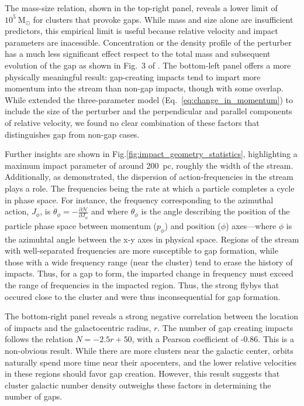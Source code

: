 \documentclass{aa}
\begin{document}
    The mass-size relation, shown in the top-right panel, reveals a lower limit of $10^5~\textrm{M}_{\odot}$ for clusters that provoke gaps. While mass and size alone are insufficient predictors, this empirical limit is useful because relative velocity and impact parameters are inacessible. Concentration or the density profile of the perturber has a much less significant effect respect to the total mass and subsequent evolution of the gap as shown in Fig.~3 of \citet{2016MNRAS.457.3817S}. The bottom-left panel offers a more physically meaningful result: gap-creating impacts tend to impart more momentum into the stream than non-gap impacts, though with some overlap. While \citet{2015MNRAS.450.1136E} extended the three-parameter model (Eq.~\ref{eq:change_in_momentum}) to include the size of the perturber and the perpendicular and parallel components of relative velocity, we found no clear combination of these factors that distinguishes gap from non-gap cases.
    
    Further insights are shown in Fig.\ref{fig:impact_geometry_statistics}, highlighting a maximum impact parameter of around 200~pc, roughly the width of the stream. Additionally, as \citet{2016MNRAS.457.3817S} demonstrated, the dispersion of action-frequencies in the stream plays a role. The frequencies being the rate at which a particle completes a cycle in phase space. For instance, the frequency corresponding to the azimuthal action, $J_\phi$, is $\dot\theta_\phi = - \frac{\mathcal{\partial H}}{\partial J_\phi}$ and where $\theta_\phi$ is the angle describing the position of the particle phase space between momentum ($p_\phi$) and position ($\phi$) axes---where $\phi$ is the azimuhtal angle between the x-y axes in physical space. Regions of the stream with well-separated frequencies are more susceptible to gap formation, while those with a wide frequency range (near the cluster) tend to erase the history of impacts. Thus, for a gap to form, the imparted change in frequency must exceed the range of frequencies in the impacted region. Thus, the strong flybys that occured close to the cluster and were thus inconsequential for gap formation.


    The bottom-right panel reveals a strong negative correlation between the location of impacts and the galactocentric radius, $r$. The number of gap creating impacts follows the relation $N = -2.5r + 50$, with a Pearson coefficient of -0.86. This is a non-obvious result. While there are more clusters near the galactic center, orbits naturally spend more time near their apocenters, and the lower relative velocities in these regions should favor gap creation. However, this result suggests that cluster galactic number density outweighs these factors in determining the number of gaps.
\end{document}
